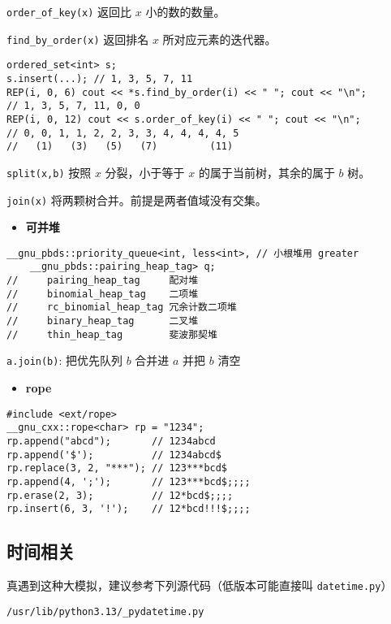 \documentclass[a4paper,landscape,twocolumn]{ctexart}
\newcommand{\point}[1]{
	\begin{itemize}
		\item \textbf{#1}
	\end{itemize}
}
\begin{document}
\texttt{order\_of\_key(x)}  返回比 $x$ 小的数的数量。

\texttt{find\_by\_order(x)}  返回排名 $x$ 所对应元素的迭代器。

\begin{lstlisting}
ordered_set<int> s;
s.insert(...); // 1, 3, 5, 7, 11
REP(i, 0, 6) cout << *s.find_by_order(i) << " "; cout << "\n";
// 1, 3, 5, 7, 11, 0, 0
REP(i, 0, 12) cout << s.order_of_key(i) << " "; cout << "\n";
// 0, 0, 1, 1, 2, 2, 3, 3, 4, 4, 4, 4, 5
//   (1)   (3)   (5)   (7)         (11)
\end{lstlisting}

\texttt{split(x,b)} 按照 $x$ 分裂，小于等于 $x$ 的属于当前树，其余的属于 $b$ 树。

\texttt{join(x)} 将两颗树合并。前提是两者值域没有交集。

\point{可并堆}

\begin{lstlisting}
__gnu_pbds::priority_queue<int, less<int>, // 小根堆用 greater
	__gnu_pbds::pairing_heap_tag> q;
//     pairing_heap_tag     配对堆
//     binomial_heap_tag    二项堆
//     rc_binomial_heap_tag 冗余计数二项堆
//     binary_heap_tag      二叉堆
//     thin_heap_tag        斐波那契堆
\end{lstlisting}

\texttt{a.join(b)}: 把优先队列 $b$ 合并进 $a$ 并把 $b$ 清空

\point{rope}

\begin{lstlisting}
#include <ext/rope>
__gnu_cxx::rope<char> rp = "1234";
rp.append("abcd");       // 1234abcd
rp.append('$');          // 1234abcd$
rp.replace(3, 2, "***"); // 123***bcd$
rp.append(4, ';');       // 123***bcd$;;;;
rp.erase(2, 3);          // 12*bcd$;;;;
rp.insert(6, 3, '!');    // 12*bcd!!!$;;;;
\end{lstlisting}

\subsection{时间相关}

真遇到这种大模拟，建议参考下列源代码（低版本可能直接叫 \texttt{datetime.py}）

\texttt{/usr/lib/python3.13/\_pydatetime.py}

%
\end{document}
